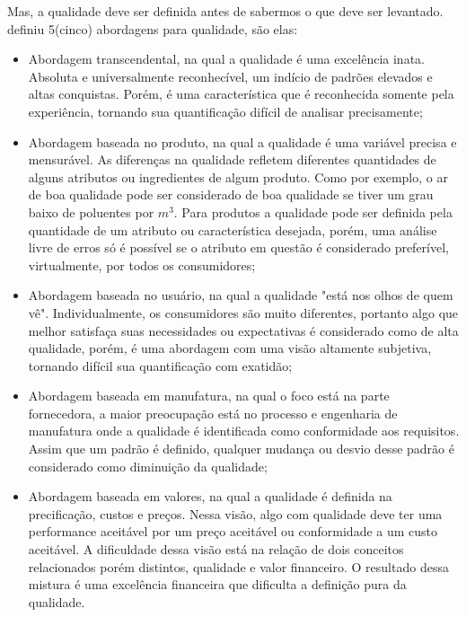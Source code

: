 Mas, a qualidade deve ser definida antes de sabermos o que deve ser levantado. \cite{garvin1984} definiu 5(cinco) abordagens para qualidade, são elas:
\begin{itemize}
	\item Abordagem transcendental, na qual a qualidade é uma excelência inata. Absoluta e universalmente reconhecível, um indício de padrões elevados e altas conquistas. Porém, é uma característica que é reconhecida somente pela experiência, tornando sua quantificação difícil de analisar precisamente;

	\item Abordagem baseada no produto, na qual a qualidade é uma variável precisa e mensurável. As diferenças na qualidade refletem diferentes quantidades de alguns atributos ou ingredientes de algum produto. Como por exemplo, o ar de boa qualidade pode ser considerado de boa qualidade se tiver um grau baixo de poluentes por $m^3$. Para produtos a qualidade pode ser definida pela quantidade de um atributo ou característica desejada, porém, uma análise livre de erros só é possível se o atributo em questão é considerado preferível, virtualmente, por todos os consumidores;

	\item Abordagem baseada no usuário, na qual a qualidade "está nos olhos de quem vê". Individualmente, os consumidores são muito diferentes, portanto algo que melhor satisfaça suas necessidades ou expectativas é considerado como de alta qualidade, porém, é uma abordagem com uma visão altamente subjetiva, tornando difícil sua quantificação com exatidão;
	
	\item Abordagem baseada em manufatura, na qual o foco está na parte fornecedora, a maior preocupação está no processo e engenharia de manufatura onde a qualidade é identificada como conformidade aos requisitos. Assim que um padrão é definido, qualquer mudança ou desvio desse padrão é considerado como diminuição da qualidade;

	\item Abordagem baseada em valores, na qual a qualidade é definida na precificação, custos e preços. Nessa visão, algo com qualidade deve ter uma performance aceitável por um preço aceitável ou conformidade a um custo aceitável. A dificuldade dessa visão está na relação de dois conceitos relacionados porém distintos, qualidade e valor financeiro. O resultado dessa mistura é uma excelência financeira que dificulta a definição pura da qualidade.
\end{itemize}

